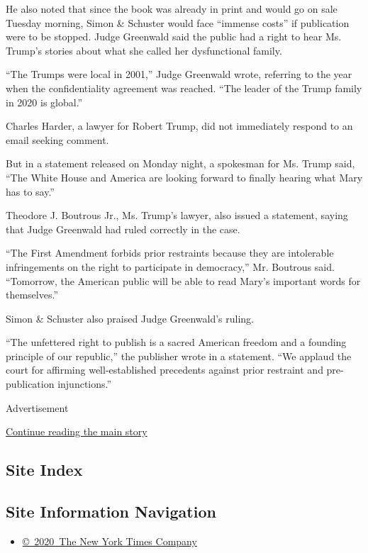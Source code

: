 He also noted that since the book was already in print and would go on
sale Tuesday morning, Simon \& Schuster would face ``immense costs'' if
publication were to be stopped. Judge Greenwald said the public had a
right to hear Ms. Trump's stories about what she called her
dysfunctional family.

``The Trumps were local in 2001,'' Judge Greenwald wrote, referring to
the year when the confidentiality agreement was reached. ``The leader of
the Trump family in 2020 is global.''

Charles Harder, a lawyer for Robert Trump, did not immediately respond
to an email seeking comment.

But in a statement released on Monday night, a spokesman for Ms. Trump
said, ``The White House and America are looking forward to finally
hearing what Mary has to say.''

Theodore J. Boutrous Jr., Ms. Trump's lawyer, also issued a statement,
saying that Judge Greenwald had ruled correctly in the case.

``The First Amendment forbids prior restraints because they are
intolerable infringements on the right to participate in democracy,''
Mr. Boutrous said. ``Tomorrow, the American public will be able to read
Mary's important words for themselves.''

Simon \& Schuster also praised Judge Greenwald's ruling.

``The unfettered right to publish is a sacred American freedom and a
founding principle of our republic,'' the publisher wrote in a
statement. ``We applaud the court for affirming well-established
precedents against prior restraint and pre-publication injunctions.''

Advertisement

\protect\hyperlink{after-bottom}{Continue reading the main story}

\hypertarget{site-index}{%
\subsection{Site Index}\label{site-index}}

\hypertarget{site-information-navigation}{%
\subsection{Site Information
Navigation}\label{site-information-navigation}}

\begin{itemize}
\tightlist
\item
  \href{https://help.nytimes.com/hc/en-us/articles/115014792127-Copyright-notice}{©~2020~The
  New York Times Company}
\end{itemize}

